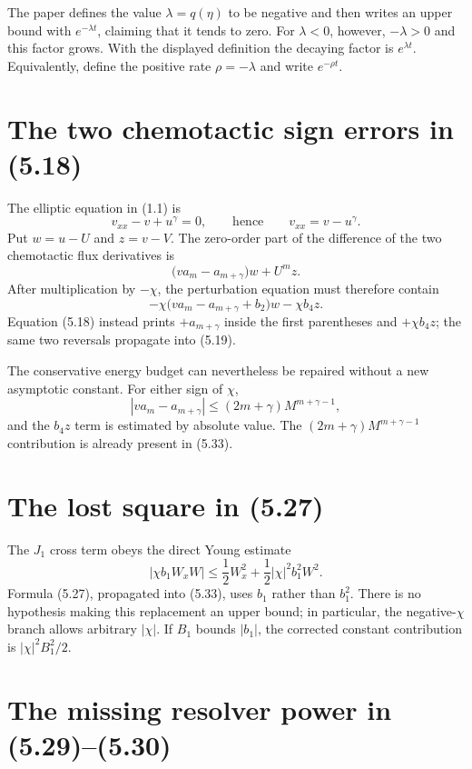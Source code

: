 \documentclass[11pt]{article}
\newcommand{\abs}[1]{\left\lvert #1\right\rvert}
\begin{document}
The paper defines the value $\lambda=q(\eta)$ to be negative and then writes
an upper bound with $e^{-\lambda t}$, claiming that it tends to zero.  For
$\lambda<0$, however, $-\lambda>0$ and this factor grows.  With the displayed
definition the decaying factor is $e^{\lambda t}$.  Equivalently, define the
positive rate $\rho=-\lambda$ and write $e^{-\rho t}$.

\section{The two chemotactic sign errors in (5.18)}

The elliptic equation in (1.1) is
\[
 v_{xx}-v+u^\gamma=0,
 \qquad\text{hence}\qquad v_{xx}=v-u^\gamma.
\]
Put $w=u-U$ and $z=v-V$.  The zero-order part of the difference of the
two chemotactic flux derivatives is
\begin{equation}
 \bigl(v a_m-a_{m+\gamma}\bigr)w+U^m z.
 \label{eq:correct-flux-zero}
\end{equation}
After multiplication by $-\chi$, the perturbation equation must therefore
contain
\begin{equation}
 -\chi\bigl(v a_m-a_{m+\gamma}+b_2\bigr)w-\chi b_4 z.
 \label{eq:correct-perturbation-zero}
\end{equation}
Equation (5.18) instead prints $+a_{m+\gamma}$ inside the first parentheses
and $+\chi b_4z$; the same two reversals propagate into (5.19).

The conservative energy budget can nevertheless be repaired without a new
asymptotic constant.  For either sign of $\chi$,
\[
 \abs{v a_m-a_{m+\gamma}}
 \leq (2m+\gamma)M^{m+\gamma-1},
\]
and the $b_4z$ term is estimated by absolute value.  The
$(2m+\gamma)M^{m+\gamma-1}$ contribution is already present in (5.33).

\section{The lost square in (5.27)}

The $J_1$ cross term obeys the direct Young estimate
\[
 \abs{\chi b_1 W_xW}
 \leq \frac12 W_x^2+\frac12\abs{\chi}^2 b_1^2W^2.
\]
Formula (5.27), propagated into (5.33), uses $b_1$ rather than $b_1^2$.
There is no hypothesis making this replacement an upper bound; in
particular, the negative-$\chi$ branch allows arbitrary $\abs{\chi}$.
If $B_1$ bounds $\abs{b_1}$, the corrected constant contribution is
$\abs{\chi}^2B_1^2/2$.

\section{The missing resolver power in (5.29)--(5.30)}
\end{document}
